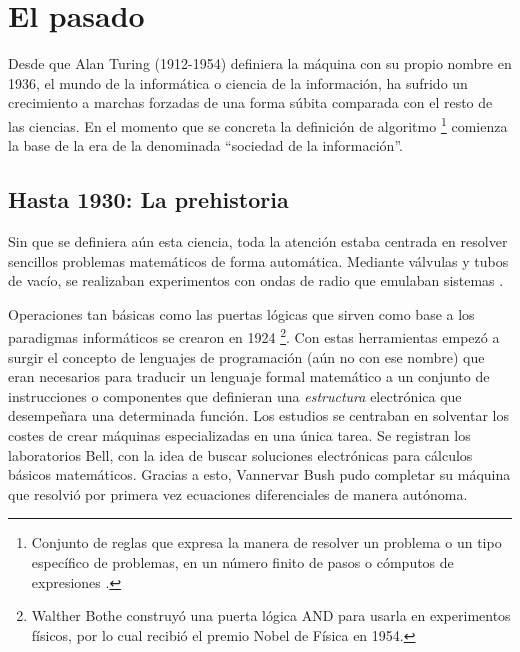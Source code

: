

\section{El pasado}
Desde que Alan Turing (1912-1954) definiera la máquina con su propio nombre 
\cite{Turing} en 1936, el mundo de la informática o ciencia de la 
información, ha sufrido un crecimiento a marchas forzadas de una forma 
súbita comparada con el resto de las ciencias. En el momento que se 
concreta la definición de algoritmo \footnote{Conjunto de reglas que 
expresa la manera de resolver un problema o un tipo específico de 
problemas, en un número finito de pasos o cómputos de 
expresiones \cite{DiccEncTec}.} comienza la base de la era de la 
denominada ``sociedad de la información''.

\subsection{Hasta 1930: La prehistoria}
Sin que se definiera aún esta ciencia, toda la atención estaba 
centrada en resolver sencillos problemas matemáticos de forma 
automática. Mediante válvulas y tubos de vacío, se realizaban 
experimentos con ondas de radio que emulaban sistemas 
\cite{IEEEhistoria}.

Operaciones tan básicas como las puertas lógicas que sirven como base 
a los paradigmas informáticos se crearon en 1924 \footnote{Walther 
Bothe construyó una puerta lógica AND para usarla en experimentos 
físicos, por lo cual recibió el premio Nobel de Física en 
1954\cite{IEEEhistoria}.}. Con estas herramientas empezó a surgir el 
concepto de lenguajes de programación (aún no con ese nombre) que 
eran necesarios para traducir un lenguaje formal matemático a un 
conjunto de instrucciones o componentes que definieran una 
\emph{estructura} electrónica que desempeñara una determinada función. 
Los estudios se centraban en solventar los costes de crear máquinas 
especializadas en una única tarea. Se registran los laboratorios Bell, 
con la idea de buscar soluciones electrónicas para cálculos básicos 
matemáticos. Gracias a esto, Vannervar Bush pudo completar su máquina 
que resolvió por primera vez ecuaciones diferenciales de manera 
autónoma.

